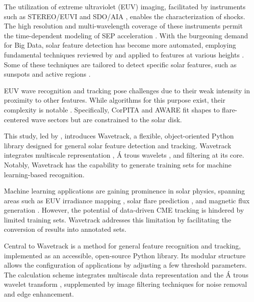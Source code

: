 The utilization of extreme ultraviolet (EUV) imaging, facilitated by instruments such as STEREO/EUVI \citep{wuelser_2004} and SDO/AIA \citep{lemen_2012}, enables the characterization of shocks. The high resolution and multi-wavelength coverage of these instruments permit the time-dependent modeling of SEP acceleration \citep{kozarev_2016, kozarev_2017, kozarev_2019}. With the burgeoning demand for Big Data, solar feature detection has become more automated, employing fundamental techniques reviewed by \citet{aschwanden_2010} and applied to features at various heights \citep{perez_Suarez_2011}. Some of these techniques are tailored to detect specific solar features, such as sunspots and active regions \citep{curto_2008}.

EUV wave recognition and tracking pose challenges due to their weak intensity in proximity to other features. While algorithms for this purpose exist, their complexity is notable \citep{podladchikova_2005, verbeeck_2014, long_2014, ireland_2019}. Specifically, CorPITA \citep{long_2014} and AWARE \citep{ireland_2019} fit shapes to flare-centered wave sectors but are constrained to the solar disk.

This study, led by \citet{stepanyuk_2022}, introduces Wavetrack, a flexible, object-oriented Python library designed for general solar feature detection and tracking. Wavetrack integrates multiscale representation \citep{starck_2002}, \'A trous wavelets \citep{akansu_1991, holschneider_1989}, and filtering at its core. Notably, Wavetrack has the capability to generate training sets for machine learning-based recognition.

Machine learning applications are gaining prominence in solar physics, spanning areas such as EUV irradiance mapping \citep{szenicer_2019}, solar flare prediction \citep{li_2013}, and magnetic flux generation \citep{kim_2019}. However, the potential of data-driven CME tracking is hindered by limited training sets. Wavetrack addresses this limitation by facilitating the conversion of results into annotated sets.

Central to Wavetrack is a method for general feature recognition and tracking, implemented as an accessible, open-source Python library. Its modular structure allows the configuration of applications by adjusting a few threshold parameters. The calculation scheme integrates multiscale data representation \citep{starck_2002} and the \'A trous wavelet transform \citep{akansu_1991, holschneider_1989}, supplemented by image filtering techniques for noise removal and edge enhancement.

